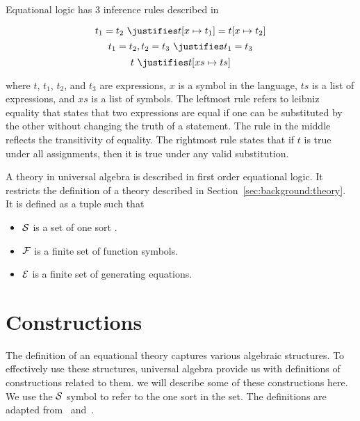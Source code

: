 Equational logic has $3$ inference rules described in~\cite{Gries1993EquationalLogic}  
\begin{proofrules}
        \[ t_1 = t_2 \ \justifies t[x \mapsto t_1] = t[x \mapsto t_2] \]
        \[ t_1 = t_2 , t_2 = t_3 \ \justifies t_1 = t_3 \]
        \[t \ \justifies t [xs \mapsto ts] \] 
\end{proofrules}       
where $t$, $t_1$, $t_2$, and $t_3$ are expressions, $x$ is a symbol in the language, $ts$ is a list of expressions, and $xs$ is a list of symbols. 
The leftmost rule refers to leibniz equality that states that two expressions are equal if one can be substituted by the other without changing the truth of a statement. 
The rule in the middle reflects the transitivity of equality. 
The rightmost rule states that if $t$ is true under all assignments, then it is true under any valid substitution.  

A theory in universal algebra is described in first order equational logic. It restricts the definition of a theory described in Section~\ref{sec:background:theory}. It is defined as a tuple \lstmath{($\sort$,$\fsyms$,$\equations$)}
such that 
\begin{itemize}
\item $\sort$ is a set of one sort . 
\item $\fsyms$ is a finite set of function symbols. 
\item $\equations$ is a finite set of generating equations. 
\end{itemize}


\section{Constructions}
\label{sec:toBeGenerated}
The definition of an equational theory captures various algebraic structures. To effectively use these structures, universal algebra provide us with definitions of constructions related to them.  we will describe some of these constructions here. We use the $\sort$ symbol to refer to the one sort in the set. The definitions are adapted from~\cite{ehrig1985fundamentals} and~\cite{handbook1993Maibaum}.  

